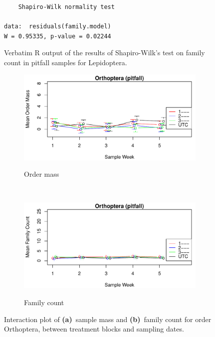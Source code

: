 \documentclass[10pt,letterpaper,twocolumn]{article}
\begin{document}
\begin{figure}[h]
	\lstset{numbers=left}
	\lstset{xleftmargin=5mm,framexleftmargin=5mm}
	\begin{lstlisting}
	Shapiro-Wilk normality test

data:  residuals(family.model)
W = 0.95335, p-value = 0.02244
	\end{lstlisting}
	\caption{Verbatim R output of the results of Shapiro-Wilk's test on family count in pitfall samples for Lepidoptera.}
	\label{fig:pitfall_lepidoptera_family_shapiro}
	\smallskip
	\nointerlineskip
	\hrulefill
\end{figure}

\begin{figure}[h]
	\centering
	\begin{subfigure}[b]{0.45\textwidth}
		\caption{Order mass}
		\includegraphics[width=\textwidth]{plots/blocks/interaction/mass/mass_pitfall_Orthoptera_interplot.pdf}
		\label{fig:pitfall_orthoptera_mass_interplot}
	\end{subfigure}
	~
	\begin{subfigure}[b]{0.45\textwidth}
		\caption{Family count}
		\includegraphics[width=\textwidth]{plots/blocks/interaction/family/family_pitfall_Orthoptera_interplot.pdf}
		\label{fig:pitfall_orthoptera_family_interplot}
	\end{subfigure}
	\caption{Interaction plot of \textbf{(a)}~sample mass and \textbf{(b)}~family count for order Orthoptera, between treatment blocks and sampling dates.}
	\label{fig:pitfall_orthoptera_interplot}
	\smallskip
	\nointerlineskip
	\hrulefill
\end{figure}
\end{document}
